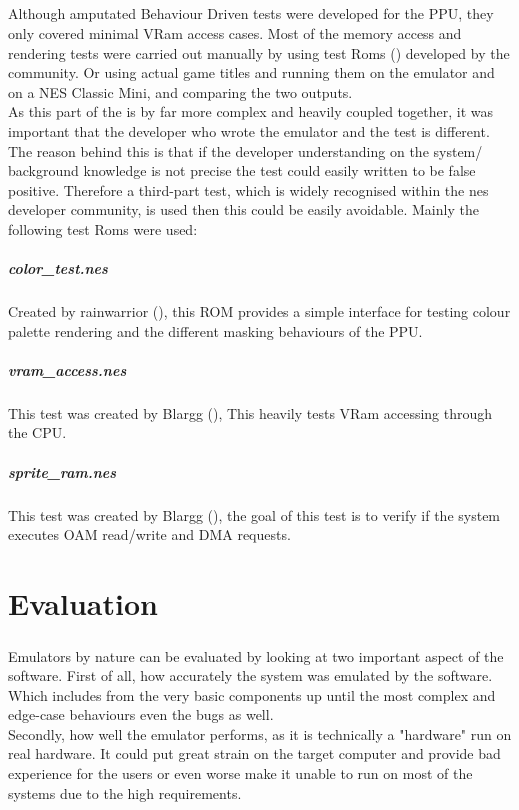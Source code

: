 \documentclass[]{report}
\begin{document}
\paragraph{ }
Although amputated Behaviour Driven tests were developed for the PPU, they only covered minimal VRam access cases. Most of the memory access and rendering tests were carried out manually by using test Roms (\cite{TRIN}) developed by the community. Or using actual game titles and running them on the emulator and on a NES Classic Mini, and comparing the two outputs.
\\
As this part of the is by far more complex and heavily coupled together, it was important that the developer who wrote the emulator and the test is different. The reason behind this is that if the developer understanding on the system/ background knowledge is not precise the test could easily written to be false positive. Therefore a third-part test, which is widely recognised within the nes developer community, is used then this could be easily avoidable. Mainly the following test Roms were used: 

\paragraph{color\_test.nes}
Created by rainwarrior (\cite{RNTS}), this ROM provides a simple interface for testing colour palette rendering and the different masking behaviours of the PPU.

\paragraph{vram\_access.nes}
This test was created by Blargg (\cite{BLGT}), This heavily tests VRam accessing through the CPU.

\paragraph{sprite\_ram.nes}
This test was created by Blargg (\cite{BLGT}), the goal of this test is to verify if the system executes OAM read/write and DMA requests.

 \chapter{Evaluation}
 \paragraph{ }
Emulators by nature can be evaluated by looking at two important aspect of the software. First of all, how accurately the system was emulated by the software. Which includes from the very basic components up until the most complex and edge-case behaviours even the bugs as well.
\\
Secondly, how well the emulator performs, as it is technically a "hardware" run on real hardware. It could put great strain on the target computer and provide bad experience for the users or even worse make it unable to run on most of the systems due to the high requirements.
\end{document}
